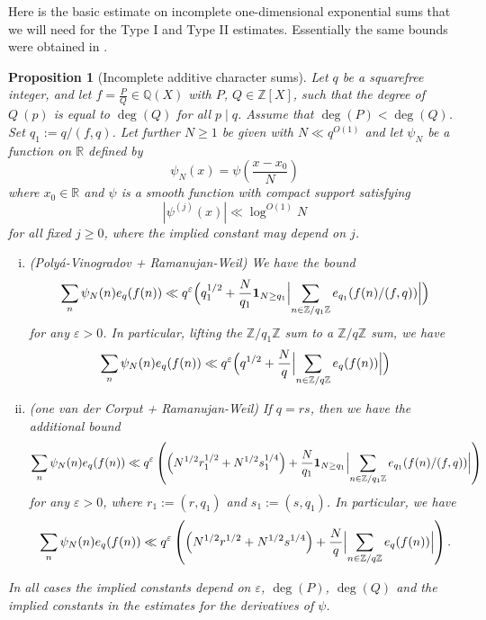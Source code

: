 \documentclass[12pt,a4paper,reqno]{amsart}
\numberwithin{equation}{section}
\theoremstyle{plain}
\newtheorem{proposition}[theorem]{Proposition}
\theoremstyle{definition}
\newcommand\R{\mathbb{R}}
\newcommand\Z{\mathbb{Z}}
\newcommand\Q{\mathbb{Q}}
\newcommand\eps{\varepsilon}
\newcommand{\onef}{\mathbf{1}}
\begin{document}
Here is the basic estimate on incomplete one-dimensional exponential
sums that we will need for the Type I and Type II estimates.  Essentially the same bounds were obtained in \cite[Theorem 2]{hb-large}.

\begin{proposition}[Incomplete additive character sums]\label{inc} Let
  $q$ be a squarefree integer, and let $f = \frac{P}{Q}\in \Q(X)$ with
  $P$, $Q\in\Z[X]$, such that the degree of $Q\
  (p)$ is equal to $\deg(Q)$ for all $p\mid q$. Assume that
  $\deg(P)<\deg(Q)$.  Set $q_1 := q/(f,q)$.  Let further $N \geq 1$ be
  given with $N\ll q^{O(1)}$ and let $\psi_N$ be a function on $\R$
  defined by
$$
\psi_N(x) = \psi\left(\frac{x-x_0}{N}\right)
$$
where $x_0\in \R$ and $\psi$ is a smooth function with compact support
satisfying
$$
|\psi^{(j)}(x)| \ll \log^{O(1)} N
$$
for all fixed $j \geq 0$, where the implied constant may depend on
$j$. 
\begin{enumerate}[(i)]
\item (Poly\'a-Vinogradov + Ramanujan-Weil) We have the bound
\begin{equation}\label{vdc-0}
  \sum_n \psi_N(n) e_q(f(n))\ll q^{\eps}\Bigl(q_1^{1/2} +
  \frac{N}{q_1}\onef_{N \geq q_1} 
  \Bigl|\sum_{n \in \Z/q_1\Z} e_{q_1}(f(n) / (f,q) )\Bigr|\Bigr)
\end{equation}
for any $\eps>0$. In particular, lifting the $\Z/q_1\Z$ sum to a $\Z/q\Z$ sum, we have
\begin{equation}\label{vdc-0-alt}
  \sum_n \psi_N(n) e_q(f(n))\ll q^{\eps}\Bigl(q^{1/2} +
  \frac{N}{q} 
  \Bigl|\sum_{n \in \Z/q\Z} e_{q}(f(n) )\Bigr|\Bigr)
\end{equation}
\item (one van der Corput + Ramanujan-Weil) If $q = rs$, then we have the
  additional bound
\begin{equation}\label{vdc-1}
  \sum_n \psi_N(n) e_q(f(n)) \ll q^{\eps}\left( \Bigl(N^{1/2}r_1^{1/2} 
  + N^{1/2} s_1^{1/4}\Bigr) +
  \frac{N}{q_1}\onef_{N \geq q_1} 
  \Bigl|\sum_{n \in \Z/q_1\Z} e_{q_1}(f(n) / (f,q) )\Bigr|\right)
\end{equation}
for any $\eps>0$, where $r_1 := (r,q_1)$ and $s_1:=(s,q_1)$.  In particular, we have
\begin{equation}\label{vdc-1-alt}
  \sum_n \psi_N(n) e_q(f(n)) \ll q^{\eps}\left( \Bigl(N^{1/2}r^{1/2} 
  + N^{1/2} s^{1/4}\Bigr) +
  \frac{N}{q} 
  \Bigl|\sum_{n \in \Z/q\Z} e_{q}(f(n) )\Bigr|\right).
\end{equation}
\end{enumerate}
In all cases the implied constants depend on $\eps$, $\deg(P)$,
$\deg(Q)$ and the implied constants in the estimates for the
derivatives of $\psi$.
\end{proposition}
\end{document}
